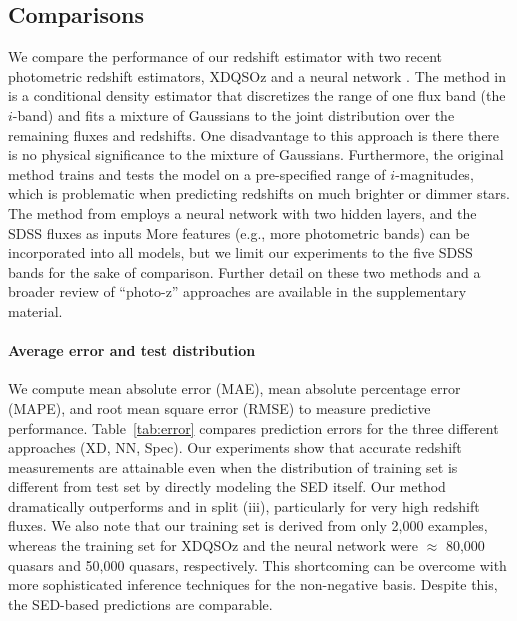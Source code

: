 \documentclass{article} %
\begin{document}
\subsection{Comparisons}
We compare the performance of our redshift estimator with two recent photometric redshift estimators, XDQSOz \cite{bovy2012photometric} and a neural network \cite{brescia2013photometric}.
The method in \cite{bovy2012photometric} is a conditional density estimator that discretizes the range of one flux band (the $i$-band) and fits a mixture of Gaussians to the joint distribution over the remaining fluxes and redshifts. 
One disadvantage to this approach is there there is no physical significance to the mixture of Gaussians. 
Furthermore, the original method trains and tests the model on a pre-specified range of $i$-magnitudes, which is problematic when predicting redshifts on much brighter or dimmer stars. 
The method from \cite{brescia2013photometric} employs a neural network with two hidden layers, and the SDSS fluxes as inputs
More features (e.g., more photometric bands) can be incorporated into all models, but we limit our experiments to the five SDSS bands for the sake of comparison.  
Further detail on these two methods and a broader review of ``photo-z'' approaches are available in the supplementary material.  

\paragraph{Average error and test distribution}
We compute mean absolute error (MAE), mean absolute percentage error (MAPE), and root mean square error (RMSE) to measure predictive performance.  
Table~\ref{tab:error} compares prediction errors for the three different approaches (XD, NN, Spec). %
Our experiments show that accurate redshift measurements are attainable even when the distribution of training set is different from test set by directly modeling the SED itself. Our method dramatically outperforms \cite{bovy2012photometric} and \cite{brescia2013photometric} in split (iii), particularly for very high redshift fluxes.  
We also note that our training set is derived from only 2,000 examples, whereas the training set for XDQSOz and the neural network were $\approx$ 80,000 quasars and 50,000 quasars, respectively.  This shortcoming can be overcome with more sophisticated inference techniques for the non-negative basis.  Despite this, the SED-based predictions are comparable.
  
\end{document}
